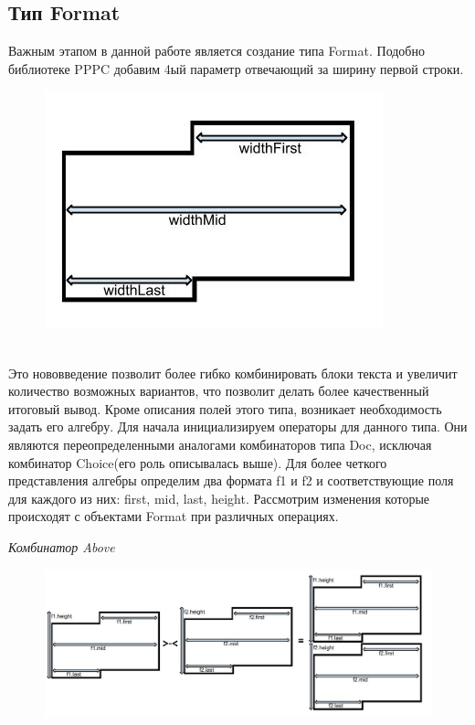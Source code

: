 \documentclass{matmex-diploma}
\begin{document}
\subsection{Тип Format}
Важным этапом в данной работе является создание типа Format. Подобно библиотеке PPPC добавим 4ый параметр отвечающий за ширину первой строки.
\begin{figure}[h]
	\includegraphics[scale=1.0]{Images/image03.png}
	\caption{}
\end{figure}
\\Это нововведение позволит более гибко комбинировать блоки текста и увеличит количество возможных вариантов, что позволит делать более качественный итоговый вывод. 
Кроме описания полей этого типа, возникает необходимость задать его алгебру. Для начала инициализируем операторы для данного типа. Они являются переопределенными аналогами комбинаторов типа Doc, исключая комбинатор Choice(его роль описывалась выше).
Для более четкого представления алгебры определим два формата f1 и f2 и соответствующие поля для каждого из них: first, mid, last, height. Рассмотрим изменения которые происходят с объектами Format при различных операциях.

\textit{Комбинатор Above}
\begin{figure}[h]
	\includegraphics[scale=0.4]{Images/image02.png}
	\caption{}
\end{figure}
\end{document}
